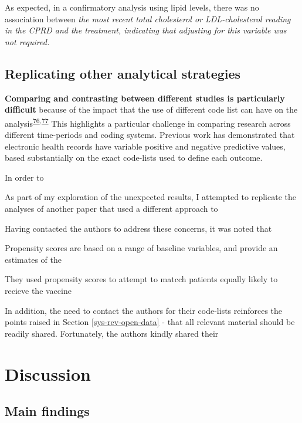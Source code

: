 \documentclass[a4paper, twoside]{templates/ociamthesis}
\begin{document}
As expected, in a confirmatory analysis using lipid levels, there was no association between \emph{the most recent total cholesterol or LDL-cholesterol reading in the CPRD and the treatment, indicating that adjusting for this variable was not required.}

\hypertarget{replicating-other-analytical-strategies}{%
\subsection{Replicating other analytical strategies}\label{replicating-other-analytical-strategies}}

\textbf{Comparing and contrasting between different studies is particularly difficult} because of the impact that the use of different code list can have on the analysis\textsuperscript{\protect\hyperlink{ref-wilkinson2018a}{76},\protect\hyperlink{ref-mcguinness2019c}{77}} This highlights a particular challenge in comparing research across different time-periods and coding systems. Previous work has demonstrated that electronic health records have variable positive and negative predictive values, based substantially on the exact code-lists used to define each outcome.

In order to

As part of my exploration of the unexpected results, I attempted to replicate the analyses of another paper that used a different approach to

Having contacted the authors to address these concerns, it was noted that

Propensity scores are based on a range of baseline variables, and provide an estimates of the

They used propensity scores to attempt to matcch patients equally likely to recieve the vaccine

In addition, the need to contact the authors for their code-lists reinforces the points raised in Section \ref{sys-rev-open-data} - that all relevant material should be readily shared. Fortunately, the authors kindly shared their

\hypertarget{discussion-2}{%
\section{Discussion}\label{discussion-2}}

\hypertarget{main-findings}{%
\subsection{Main findings}\label{main-findings}}
\end{document}
